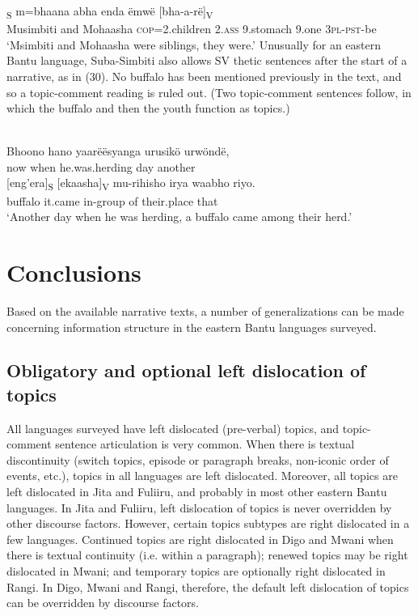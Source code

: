 \documentclass[output=paper]{langsci/langscibook}
\begin{document}
\textsubscript{S} m=bhaana abha enda ëmwë [bha-a-rë]\textsubscript{V}\\
Musimbiti and Mohaasha \textsc{cop}=2.children 2.\textsc{ass }9.stomach 9.one \textsc{3pl-pst}{}-be\\


‘Msimbiti and Mohaasha were siblings, they were.’
\z
Unusually for an eastern Bantu language, Suba-Simbiti also allows SV thetic sentences after the start of a narrative, as in (30). No buffalo has been mentioned previously in the text, and so a topic-comment reading is ruled out. (Two topic-comment sentences follow, in which the buffalo and then the youth function as topics.)

\ea\label{ex:}
\\
\gll Bhoono hano yaarëësyanga urusikö urwöndë,\\
now when he.was.herding day another\\
\gll {}[eng’era]\textsubscript{S} [ekaasha]\textsubscript{V} mu-rihisho irya waabho riyo.\\
buffalo it.came in-group of their.place that\\
\upshape
‘Another day when he was herding, a buffalo came among their herd.’
\z
\section{Conclusions}

Based on the available narrative texts, a number of generalizations can be made concerning information structure in the eastern Bantu languages surveyed.

\subsection{Obligatory and optional left dislocation of topics}

All languages surveyed have left dislocated (pre-verbal) topics, and topic-comment sentence articulation is very common. When there is textual discontinuity (switch topics, episode or paragraph breaks, non-iconic order of events, etc.), topics in all languages are left dislocated. Moreover, all topics are left dislocated in Jita and Fuliiru, and probably in most other eastern Bantu languages. In Jita and Fuliiru, left dislocation of topics is never overridden by other discourse factors. However, certain topics subtypes are right dislocated in a few languages. Continued topics are right dislocated in Digo and Mwani when there is textual continuity (i.e. within a paragraph); renewed topics may be right dislocated in Mwani; and temporary topics are optionally right dislocated in Rangi. In Digo, Mwani and Rangi, therefore, the default left dislocation of topics can be overridden by discourse factors.
\end{document}
